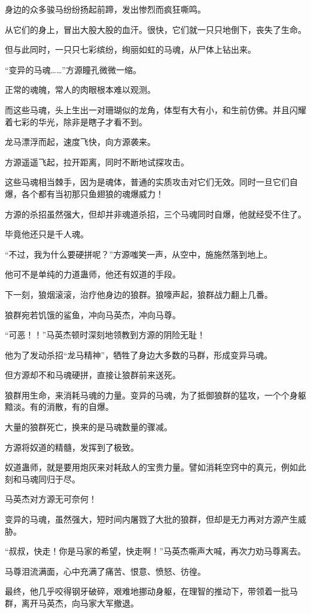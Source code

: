 \begin{this_body}
身边的众多骏马纷纷扬起前蹄，发出惨烈而疯狂嘶鸣。

从它们的身上，冒出大股大股的血汗。很快，它们就一只只地倒下，丧失了生命。

但与此同时，一只只七彩缤纷，绚丽如虹的马魂，从尸体上钻出来。

“变异的马魂……”方源瞳孔微微一缩。

正常的魂魄，常人的肉眼根本难以观测。

而这些马魂，头上生出一对珊瑚似的龙角，体型有大有小，和生前仿佛。并且闪耀着七彩的华光，除非是瞎子才看不到。

龙马漂浮而起，速度飞快，向方源袭来。

方源遥遥飞起，拉开距离，同时不断地试探攻击。

这些马魂相当棘手，因为是魂体，普通的实质攻击对它们无效。同时一旦它们自爆，各个都有当初那只鱼翅狼的魂爆威力！

方源的杀招虽然强大，但却并非魂道杀招，三个马魂同时自爆，他就经受不住了。

毕竟他还只是千人魂。

“不过，我为什么要硬拼呢？”方源嗤笑一声，从空中，施施然落到地上。

他可不是单纯的力道蛊师，他还有奴道的手段。

下一刻，狼烟滚滚，治疗他身边的狼群。狼嚎声起，狼群战力翻上几番。

狼群宛若饥饿的鲨鱼，冲向马英杰，冲向马尊。

“可恶！！”马英杰顿时深刻地领教到方源的阴险无耻！

他为了发动杀招“龙马精神”，牺牲了身边大多数的马群，形成变异马魂。

但方源却不和马魂硬拼，直接让狼群前来送死。

狼群用生命，来消耗马魂的力量。变异的马魂，为了抵御狼群的猛攻，一个个身躯黯淡。有的消散，有的自爆。

大量的狼群死亡，换来的是马魂数量的骤减。

方源将奴道的精髓，发挥到了极致。

奴道蛊师，就是要用炮灰来对耗敌人的宝贵力量。譬如消耗空窍中的真元，例如此刻和马魂同归于尽。

马英杰对方源无可奈何！

变异的马魂，虽然强大，短时间内屠戮了大批的狼群，但却是无力再对方源产生威胁。

“叔叔，快走！你是马家的希望，快走啊！”马英杰嘶声大喊，再次力劝马尊离去。

马尊泪流满面，心中充满了痛苦、恨意、愤怒、彷徨。

最终，他几乎咬得钢牙破碎，艰难地挪动身躯，在理智的推动下，带领着一批马群，离开马英杰，向马家大军撤退。


\end{this_body}
